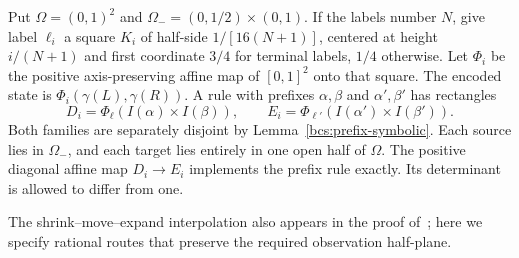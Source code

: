 Put $\Omega=(0,1)^2$ and $\Omega_-=(0,1/2)\times(0,1)$. If the labels number $N$, give label $\ell_i$ a square $K_i$ of half-side $1/[16(N+1)]$, centered at height $i/(N+1)$ and first coordinate $3/4$ for terminal labels, $1/4$ otherwise. Let $\Phi_i$ be the positive axis-preserving affine map of $[0,1]^2$ onto that square. The encoded state is
$\Phi_i(\gamma(L),\gamma(R))$. A rule with prefixes $\alpha,\beta$ and $\alpha',\beta'$ has rectangles
\[
 D_i=\Phi_\ell(I(\alpha)\times I(\beta)),\qquad
 E_i=\Phi_{\ell'}(I(\alpha')\times I(\beta')).
\]
Both families are separately disjoint by Lemma~\ref{bcs:prefix-symbolic}. Each source lies in $\Omega_-$, and each target lies entirely in one open half of $\Omega$. The positive diagonal affine map $D_i\to E_i$ implements the prefix rule exactly. Its determinant is allowed to differ from one.

The shrink--move--expand interpolation also appears in the proof of~\cite[Proposition~5.1]{CardonaMirandaPeraltaSalasPresas2021}; here we specify rational routes that preserve the required observation half-plane.

